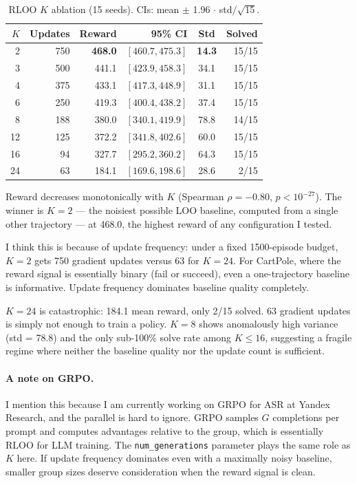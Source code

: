 \documentclass{article}
\begin{document}
\begin{table}[h]
\caption{RLOO $K$ ablation (15 seeds). CIs: mean $\pm$ 1.96 $\cdot$ std$/\sqrt{15}$.}
\label{tab:rloo}
\centering
\small
\begin{tabular}{rrrrcr}
\toprule
$K$ & Updates & Reward & 95\% CI & Std & Solved \\
\midrule
2  & 750 & \textbf{468.0} & $[460.7, 475.3]$ & \textbf{14.3} & 15/15 \\
3  & 500 & 441.1 & $[423.9, 458.3]$ & 34.1 & 15/15 \\
4  & 375 & 433.1 & $[417.3, 448.9]$ & 31.1 & 15/15 \\
6  & 250 & 419.3 & $[400.4, 438.2]$ & 37.4 & 15/15 \\
8  & 188 & 380.0 & $[340.1, 419.9]$ & 78.8 & 14/15 \\
12 & 125 & 372.2 & $[341.8, 402.6]$ & 60.0 & 15/15 \\
16 & 94  & 327.7 & $[295.2, 360.2]$ & 64.3 & 15/15 \\
24 & 63  & 184.1 & $[169.6, 198.6]$ & 28.6 & 2/15 \\
\bottomrule
\end{tabular}
\end{table}

Reward decreases monotonically with $K$ (Spearman $\rho = -0.80$, $p < 10^{-27}$).
The winner is $K{=}2$ --- the noisiest possible LOO baseline, computed from a single other trajectory --- at 468.0, the highest reward of any configuration I tested.

I think this is because of update frequency: under a fixed 1500-episode budget, $K{=}2$ gets 750 gradient updates versus 63 for $K{=}24$.
For CartPole, where the reward signal is essentially binary (fail or succeed), even a one-trajectory baseline is informative.
Update frequency dominates baseline quality completely.

$K{=}24$ is catastrophic: 184.1 mean reward, only 2/15 solved.
63 gradient updates is simply not enough to train a policy.
$K{=}8$ shows anomalously high variance (std = 78.8) and the only sub-100\% solve rate among $K \leq 16$, suggesting a fragile regime where neither the baseline quality nor the update count is sufficient.

\paragraph{A note on GRPO.}
I mention this because I am currently working on GRPO for ASR at Yandex Research, and the parallel is hard to ignore.
GRPO samples $G$ completions per prompt and computes advantages relative to the group, which is essentially RLOO for LLM training.
The \texttt{num\_generations} parameter plays the same role as $K$ here.
If update frequency dominates even with a maximally noisy baseline, smaller group sizes deserve consideration when the reward signal is clean.
\end{document}
